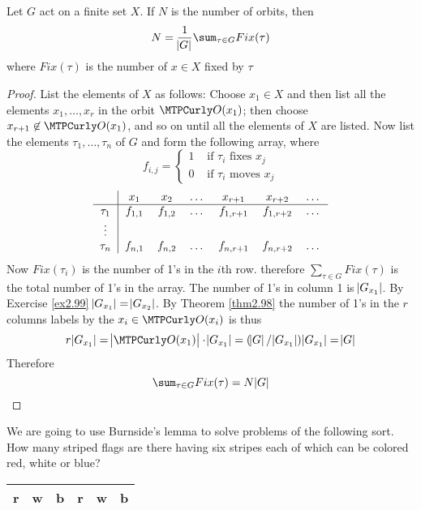 \documentclass[11pt]{article}
\begin{document}
\begin{theorem}
Let \(G\) act on a finite set \(X\). If \(N\) is the number of orbits, then
\begin{equation*}
N=\frac{1}{\abs{G}}\displaystyle\sum_{\tau\in G}Fix(\tau)
\end{equation*}
where \(Fix(\tau)\) is the number of \(x\in X\) fixed by \(\tau\)
\end{theorem}
\begin{proof}
List the elements of \(X\) as follows: Choose \(x_1\in X\) and then list all the
elements \(x_1,\dots,x_r\) in the orbit \(\calo(x_1)\); then choose
\(x_{r+1}\not\in\calo(x_1)\), and so on until all the elements of \(X\) are listed.
Now list the elements \(\tau_1,\dots,\tau_n\) of \(G\) and form the following array,
where
\begin{equation*}
f_{i,j}=
\begin{cases}
1&\text{ if }\tau_i\text{ fixes }x_j\\
0&\text{ if }\tau_i\text{ moves }x_j
\end{cases}
\end{equation*}
\[
\begin{tabular}{c|cccccc}
  & $x_1$ & $x_2$ & $\dots$ & $x_{r+1}$ & $x_{r+2}$ & $\dots$ \\
\hline $\tau_1$ & $f_{1,1}$ & $f_{1,2}$ & $\dots$ & $f_{1,r+1}$ & $f_{1,r+2}$ & $\dots$ \\
 $\vdots$ &  &  &  &  &  &  \\
 $\tau_n$ & $f_{n,1}$ & $f_{n,2}$ & $\dots$ & $f_{n,r+1}$ & $f_{n,r+2}$ & $\dots$ \\
\end{tabular}
\]
Now \(Fix(\tau_i)\) is the number of 1's in the \(i\)th row. therefore 
\(\sum_{\tau\in G}Fix(\tau)\) is the total number of 1's in the array. The number
of 1's in column 1 is \(\abs{G_{x_1}}\). By Exercise \ref{ex2.99}
\(\abs{G_{x_1}}=\abs{G_{x_2}}\). By Theorem \ref{thm2.98} the number of 1's in the
\(r\) columns labels by the \(x_i\in\calo(x_i)\) is thus
\begin{equation*}
r\abs{G_{x_1}}=\abs{\calo(x_1)}\cdot\abs{G_{x_1}}=(\abs{G}/
\abs{G_{x_1}})\abs{G_{x_1}}=\abs{G}
\end{equation*}
Therefore
\begin{equation*}
\displaystyle\sum_{\tau\in G}Fix(\tau)=N\abs{G}
\end{equation*}
\end{proof}

We are going to use Burnside's lemma to solve problems of the following sort.
How many striped flags are there having six stripes each of which can be colored
red, white or blue?
\begin{center}
\begin{tabular}{|c|c|c|c|c|c|}
\hline
r & w & b & r & w & b\\
\hline
\end{tabular}
\end{center}
\end{document}
